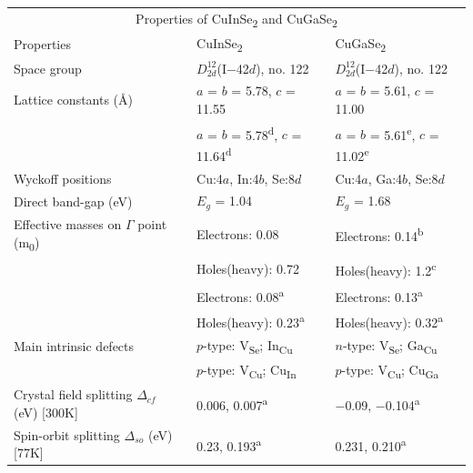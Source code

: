 \documentclass[a4paper, 12pt, titlepage,oneside,drop]{kthesis}
\begin{document}
\vspace{10cm}

\begin {table}[!htb]
\centering
\begin{tabular}{l l l}  
\toprule
\toprule
\multicolumn{3}{c}{\large Properties of CuInSe\textsubscript{2} and CuGaSe\textsubscript{2}}  \\  
\cellcolor{blue!25} Properties & \cellcolor{blue!25} CuInSe\textsubscript{2} & \cellcolor{blue!25} CuGaSe\textsubscript{2} \\ 

Space group & $D_{2d}^{12}$(I$-$42$d$), no. 122 & $D_{2d}^{12}$(I$-$42$d$), no. 122 \\ 
\rowcolor[gray]{0.9}
Lattice constants (Å) & $a$ = $b$ = 5.78, $c$ = 11.55 & $a$ = $b$ = 5.61, $c$ = 11.00 \\ 
                      & $a$ = $b$ = 5.78\textsuperscript{d}, $c$ = 11.64\textsuperscript{d} & $a$ = $b$ = 5.61\textsuperscript{e}, $c$ = 11.02\textsuperscript{e} \\ 
Wyckoff positions & Cu:4$a$, In:4$b$, Se:8$d$ & Cu:4$a$, Ga:4$b$, Se:8$d$ \\ 
\rowcolor[gray]{0.9}
Direct band-gap (eV) & $E_g$ = 1.04 & $E_g$ = 1.68 \\ 
Effective masses on $\Gamma$ point (m\textsubscript{0}) & Electrons: 0.08& Electrons: 0.14\textsuperscript{b} \\ 
                                      & Holes(heavy): 0.72& Holes(heavy): 1.2\textsuperscript{c} \\ 
                                      & Electrons: 0.08\textsuperscript{a} & Electrons: 0.13\textsuperscript{a}\\
                                     & Holes(heavy): 0.23\textsuperscript{a} & Holes(heavy): 0.32\textsuperscript{a} \\ 
\rowcolor[gray]{0.9}
Main intrinsic defects & $p$-type: V\textsubscript{Se}; In\textsubscript{Cu} &  $n$-type: V\textsubscript{Se}; Ga\textsubscript{Cu}\\
\rowcolor[gray]{0.9}   & $p$-type: V\textsubscript{Cu}; Cu\textsubscript{In} &  $p$-type: V\textsubscript{Cu}; Cu\textsubscript{Ga}  \\  
Crystal field splitting $\Delta_{cf}$ (eV) [300K] & 0.006, 0.007\textsuperscript{a} & $-$0.09, $-$0.104\textsuperscript{a} \\ 
\rowcolor[gray]{0.9}
Spin-orbit splitting $\Delta_{so}$ (eV) [77K] & 0.23, 0.193\textsuperscript{a} & 0.231, 0.210\textsuperscript{a} \\ 

\end{tabular}
\end{table}
\end{document}
